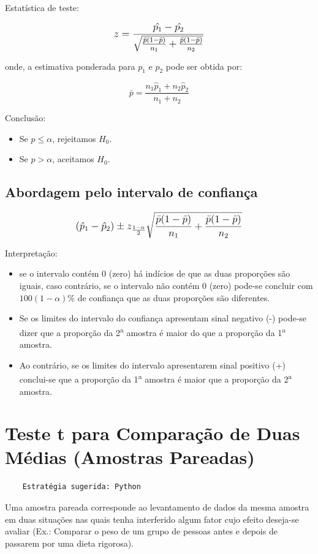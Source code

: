 Estatística de teste:

\[\beq{ z = \frac{\hat{p_1}-\hat{p_2}}{\sqrt{\frac{\bar{p}(1-\bar{p})}{n_1}+\frac{\bar{p}(1-\bar{p})}{n_2}} }}\]

onde, a estimativa ponderada para \(p_1\) e \(p_2\) pode ser obtida por:

\[\bar{p}=\frac{n_1\hat{p}_1 + n_2\hat{p}_2}{n_1+n_2}\]

Conclusão:
\begin{itemize}
	\item Se \(p \leq \alpha\), rejeitamos \(H_0\).
	\item Se \(p > \alpha\), aceitamos \(H_0\).
\end{itemize}

\subsection{Abordagem pelo intervalo de confiança}

\[\beq{ (\hat{p}_1-\hat{p}_2) \pm z_{\frac{1-\alpha}{2}} \sqrt{\frac{\bar{p}(1-\bar{p})}{n_1}+\frac{\bar{p}(1-\bar{p})}{n_2}} }\]

Interpretação:

\begin{itemize}
	\item se o intervalo contém 0 (zero) há indícios de que as duas proporções são iguais, caso contrário, se o intervalo não contém 0 (zero) pode-se concluir com \( 100(1-\alpha)\% \) de confiança que as duas proporções são diferentes.
		\item Se os limites do intervalo do confiança apresentam sinal negativo (-) pode-se dizer que a proporção da 2\textsuperscript{a} amostra é maior do que a proporção da 1\textsuperscript{a} amostra.
	\item Ao contrário, se os limites do intervalo apresentarem sinal positivo (+) conclui-se que a proporção da 1\textsuperscript{a} amostra é maior que a proporção da 2\textsuperscript{a} amostra.
\end{itemize}

\section{Teste t para Comparação de Duas Médias (Amostras Pareadas)}

\begin{verbatim}
	Estratégia sugerida: Python 
\end{verbatim}

Uma amostra pareada corresponde ao levantamento de dados da mesma amostra em duas situações nas quais tenha interferido algum fator cujo efeito deseja-se avaliar (Ex.: Comparar o peso de um grupo de pessoas antes e depois de passarem por uma dieta rigorosa).

